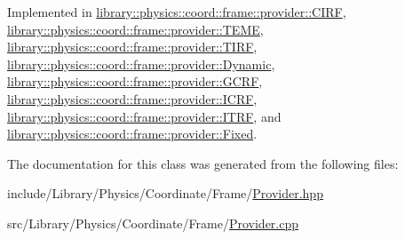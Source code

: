 Implemented in \hyperlink{classlibrary_1_1physics_1_1coord_1_1frame_1_1provider_1_1_c_i_r_f_ab5676de1c31ad796d56a684615fabdf8}{library\+::physics\+::coord\+::frame\+::provider\+::\+C\+I\+RF}, \hyperlink{classlibrary_1_1physics_1_1coord_1_1frame_1_1provider_1_1_t_e_m_e_a8c52ea8c59a669197234383e4bfa54b6}{library\+::physics\+::coord\+::frame\+::provider\+::\+T\+E\+ME}, \hyperlink{classlibrary_1_1physics_1_1coord_1_1frame_1_1provider_1_1_t_i_r_f_a3656639fda8a7b991335752559d7594b}{library\+::physics\+::coord\+::frame\+::provider\+::\+T\+I\+RF}, \hyperlink{classlibrary_1_1physics_1_1coord_1_1frame_1_1provider_1_1_dynamic_a0527b3fd86cdd8070f1697c057f06479}{library\+::physics\+::coord\+::frame\+::provider\+::\+Dynamic}, \hyperlink{classlibrary_1_1physics_1_1coord_1_1frame_1_1provider_1_1_g_c_r_f_a0e6155c096ff1c231b14e59544fe038c}{library\+::physics\+::coord\+::frame\+::provider\+::\+G\+C\+RF}, \hyperlink{classlibrary_1_1physics_1_1coord_1_1frame_1_1provider_1_1_i_c_r_f_a533e5d0240150b5c23080ee8bf89d040}{library\+::physics\+::coord\+::frame\+::provider\+::\+I\+C\+RF}, \hyperlink{classlibrary_1_1physics_1_1coord_1_1frame_1_1provider_1_1_i_t_r_f_a10a6a129ab5410f3ad3d687f73ba6d8e}{library\+::physics\+::coord\+::frame\+::provider\+::\+I\+T\+RF}, and \hyperlink{classlibrary_1_1physics_1_1coord_1_1frame_1_1provider_1_1_fixed_ac7a58fa0937c28ed0289c1088275c3d2}{library\+::physics\+::coord\+::frame\+::provider\+::\+Fixed}.



The documentation for this class was generated from the following files\+:\begin{DoxyCompactItemize}
\item 
include/\+Library/\+Physics/\+Coordinate/\+Frame/\hyperlink{_provider_8hpp}{Provider.\+hpp}\item 
src/\+Library/\+Physics/\+Coordinate/\+Frame/\hyperlink{_provider_8cpp}{Provider.\+cpp}\end{DoxyCompactItemize}
